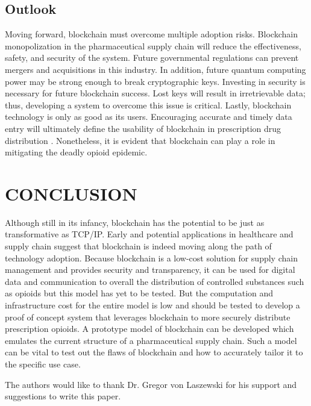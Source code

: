 \documentclass[sigconf]{acmart}
\begin{document}
\subsection{Outlook}
Moving forward, blockchain must overcome multiple adoption risks. Blockchain monopolization in the pharmaceutical supply chain will reduce the effectiveness, safety, and security of the system. Future governmental regulations can prevent mergers and acquisitions in this industry. In addition, future quantum computing power may be strong enough to break cryptographic keys. Investing in security is necessary for future blockchain success. Lost keys will result in irretrievable data; thus, developing a system to overcome this issue is critical. Lastly, blockchain technology is only as good as its users. Encouraging accurate and timely data entry will ultimately define the usability of blockchain in prescription drug distribution \cite{hitchingHealthcare}. Nonetheless, it is evident that blockchain can play a role in mitigating the deadly opioid epidemic. 

\section{CONCLUSION}
Although still in its infancy, blockchain has the potential to be just as transformative as TCP/IP. Early and potential applications in healthcare and supply chain suggest that blockchain is indeed moving along the path of technology adoption. Because blockchain is a low-cost solution for supply chain management and provides security and transparency, it can be used for digital data and communication to overall the distribution of controlled substances such as opioids but this model has yet to be tested. But the computation and infrastructure cost for the entire model is low and should be tested to develop a proof of concept system that leverages blockchain to more securely distribute prescription opioids. A prototype model of blockchain can be developed which emulates the current structure of a pharmaceutical supply chain. Such a model can be vital to test out the flaws of blockchain and how to accurately tailor it to the specific use case.  

\begin{acks}
The authors would like to thank Dr. Gregor von Laszewski for his support and suggestions to write this paper.
\end{acks}


 
\end{document}
